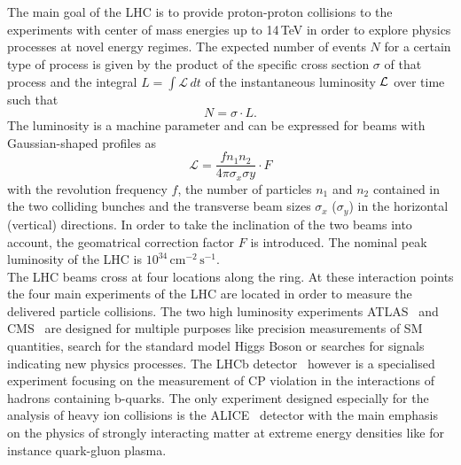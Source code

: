 \\
\\
The main goal of the LHC is to provide proton-proton collisions to the experiments with center of mass energies up to 14\,TeV in order to explore physics processes at novel energy regimes. The expected number of events $N$ for a certain type of process is given by the product of the specific cross section $\sigma$ of that process and the integral $L = \int \mathcal{L}  \, dt$ of the instantaneous luminosity $\cal L$ over time such that
\begin{equation}
  N = \sigma \cdot L . 
  \label{eq:lumi}
\end{equation}
The luminosity is a machine parameter and can be expressed for beams with Gaussian-shaped profiles as  
\begin{equation}
  \mathcal{L} = \frac{f n_{1} n_{2}}{4 \pi \sigma_{x} \sigma{y}} \cdot F
  \label{eq:lumi}
\end{equation}
with the revolution frequency $f$, the number of particles $n_1$ and $n_2$ contained in the two colliding bunches and the transverse beam sizes $\sigma_{x}$ ($\sigma_{y}$) in the horizontal (vertical) directions. In order to take the inclination of the two beams into account, the geomatrical correction factor $F$ is introduced. The nominal peak luminosity of the LHC is $10^{34} \, \mathrm{cm}^{-2} \, \mathrm{s}^{-1}$.\\
The LHC beams cross at four locations along the ring. At these interaction points the four main experiments of the LHC are located in order to measure the delivered particle collisions. The two high luminosity experiments ATLAS~\cite{det::ATLAS} and CMS~\cite{Chatrchyan:2008zzk, bib:cmsptdr1} are designed for multiple purposes like precision measurements of SM quantities, search for the standard model Higgs Boson or searches for signals indicating new physics processes. The LHCb detector~\cite{det::LHCb} however is a specialised experiment focusing on the measurement of CP violation in the interactions of hadrons containing b-quarks. The only experiment designed especially for the analysis of heavy ion collisions is the ALICE~\cite{det::ALICE} detector with the main emphasis on the physics of strongly interacting matter at extreme energy densities like for instance quark-gluon plasma.

